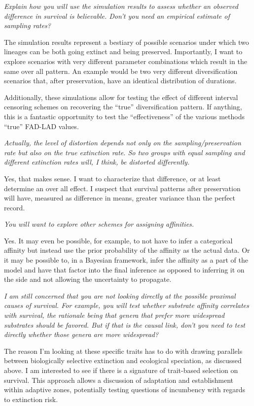 \documentclass{article}
\begin{document}
\textit{Explain how you will use the simulation results to assess whether an observed difference in survival is believable.  Don't you need an empirical estimate of sampling rates?}

The simulation results represent a bestiary of possible scenarios under which two lineages can be both going extinct and being preserved. Importantly, I want to explore scenarios with very different parameter combinations which result in the same over all pattern. An example would be two very different diversification scenarios that, after preservation, have an identical distribution of durations.

Additionally, these simulations allow for testing the effect of different interval censoring schemes on recovering the ``true'' diversification pattern. If anything, this is a fantastic opportunity to test the ``effectiveness'' of the various methods ``true'' FAD-LAD values.


\textit{Actually, the level of distortion depends not only on the sampling/preservation rate but also on the true extinction rate.  So two groups with equal sampling and different extinction rates will, I think, be distorted differently.}

Yes, that makes sense. I want to characterize that difference, or at least determine an over all effect. I suspect that survival patterns after preservation will have, measured as difference in means, greater variance than the perfect record.


\textit{You will want to explore other schemes for assigning affinities.}

Yes. It may even be possible, for example, to not have to infer a categorical affinity but instead use the prior probability of the affinity as the actual data. Or it may be possible to, in a Bayesian framework, infer the affinity as a part of the model and have that factor into the final inference as opposed to inferring it on the side and not allowing the uncertainty to propagate.


\textit{I am still concerned that you are not looking directly at the possible proximal causes of survival.  For example, you will test whether substrate affinity correlates with survival, the rationale being that genera that prefer more widespread substrates should be favored.  But if that is the causal link, don't you need to test directly whether those genera are more widespread?}

The reason I'm looking at these specific traits has to do with drawing parallels between biologically selective extinction and ecological speciation, as discussed above. I am interested to see if there is a signature of trait-based selection on survival. This approach allows a discussion of adaptation and establishment within adaptive zones, potentially testing questions of incumbency with regards to extinction risk.
\end{document}
